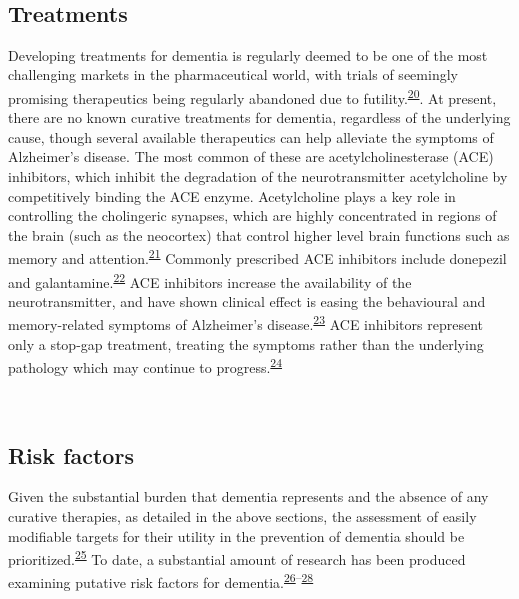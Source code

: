 \documentclass[a4paper, twoside]{templates/ociamthesis}
\begin{document}
~

\hypertarget{intro-treatments}{%
\subsection{Treatments}\label{intro-treatments}}

Developing treatments for dementia is regularly deemed to be one of the most challenging markets in the pharmaceutical world, with trials of seemingly promising therapeutics being regularly abandoned due to futility.\textsuperscript{\protect\hyperlink{ref-cummings2020}{20}}. At present, there are no known curative treatments for dementia, regardless of the underlying cause, though several available therapeutics can help alleviate the symptoms of Alzheimer's disease.
The most common of these are acetylcholinesterase (ACE) inhibitors, which inhibit the degradation of the neurotransmitter acetylcholine by competitively binding the ACE enzyme. Acetylcholine plays a key role in controlling the cholingeric synapses, which are highly concentrated in regions of the brain (such as the neocortex) that control higher level brain functions such as memory and attention.\textsuperscript{\protect\hyperlink{ref-hampel2018}{21}} Commonly prescribed ACE inhibitors include donepezil and galantamine.\textsuperscript{\protect\hyperlink{ref-pariente2008}{22}} ACE inhibitors increase the availability of the neurotransmitter, and have shown clinical effect is easing the behavioural and memory-related symptoms of Alzheimer's disease.\textsuperscript{\protect\hyperlink{ref-marucci2020}{23}} ACE inhibitors represent only a stop-gap treatment, treating the symptoms rather than the underlying pathology which may continue to progress.\textsuperscript{\protect\hyperlink{ref-francis2010}{24}}

~

\hypertarget{risk-factors}{%
\subsection{Risk factors}\label{risk-factors}}

Given the substantial burden that dementia represents and the absence of any curative therapies, as detailed in the above sections, the assessment of easily modifiable targets for their utility in the prevention of dementia should be prioritized.\textsuperscript{\protect\hyperlink{ref-winblad2016}{25}} To date, a substantial amount of research has been produced examining putative risk factors for dementia.\textsuperscript{\protect\hyperlink{ref-feingold2000}{26}--\protect\hyperlink{ref-anstey2019}{28}}
\end{document}
